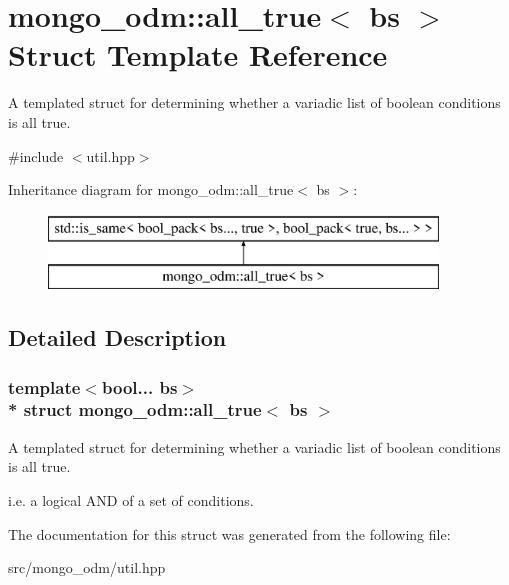 \hypertarget{structmongo__odm_1_1all__true}{}\section{mongo\+\_\+odm\+:\+:all\+\_\+true$<$ bs $>$ Struct Template Reference}
\label{structmongo__odm_1_1all__true}


A templated struct for determining whether a variadic list of boolean conditions is all true.  




{\ttfamily \#include $<$util.\+hpp$>$}

Inheritance diagram for mongo\+\_\+odm\+:\+:all\+\_\+true$<$ bs $>$\+:\begin{figure}[H]
\begin{center}
\leavevmode
\includegraphics[height=2.000000cm]{structmongo__odm_1_1all__true}
\end{center}
\end{figure}


\subsection{Detailed Description}
\subsubsection*{template$<$bool... bs$>$\\*
struct mongo\+\_\+odm\+::all\+\_\+true$<$ bs $>$}

A templated struct for determining whether a variadic list of boolean conditions is all true. 

i.\+e. a logical A\+ND of a set of conditions. 

The documentation for this struct was generated from the following file\+:\begin{DoxyCompactItemize}
\item 
src/mongo\+\_\+odm/util.\+hpp\end{DoxyCompactItemize}
